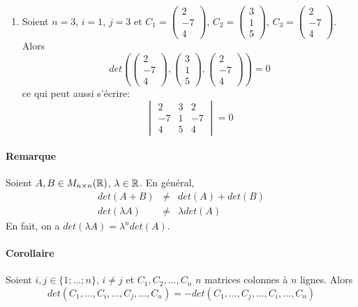 \begin{enumerate}
  \item Soient $n = 3$, $i = 1$, $j = 3$ et $C_1 = \begin{pmatrix} 2 \\ -7 \\ 4 \end{pmatrix}$, $C_2 = \begin{pmatrix} 3 \\ 1 \\ 5 \end{pmatrix}$, $C_3 = \begin{pmatrix} 2 \\ -7 \\ 4 \end{pmatrix}$. Alors
    $$det\left(
        \begin{pmatrix} 2 \\ -7 \\ 4 \end{pmatrix}, 
        \begin{pmatrix} 3 \\ 1 \\ 5 \end{pmatrix}, 
        \begin{pmatrix} 2 \\ -7 \\ 4 \end{pmatrix}
      \right) = 0$$
    ce qui peut aussi s'écrire:
    $$\begin{vmatrix}
        2 & 3 & 2 \\
        -7 & 1 & -7 \\
        4 & 5 & 4
      \end{vmatrix}=0$$
\end{enumerate}

\paragraph{Remarque} Soient $A, B \in M_{n \times n}(\mathbb{R})$, $\lambda \in \mathbb{R}$. En général,
\begin{eqnarray*}
  det(A + B) &\neq& det(A) + det(B) \\
  det(\lambda A) &\neq& \lambda det(A)
\end{eqnarray*}
En fait, on a $det(\lambda A) = \lambda^{n} det(A)$.

\paragraph{Corollaire} Soient $i, j \in \{1; \ldots; n\}$, $i\neq j$ et $C_1, C_2, \ldots, C_n$ $n$ matrices colonnes à $n$ lignes. Alors
$$det(C_1, \ldots, C_i, \ldots, C_j, \ldots, C_n) = -det(C_1, \ldots, C_j, \ldots, C_i, \ldots, C_n)$$

